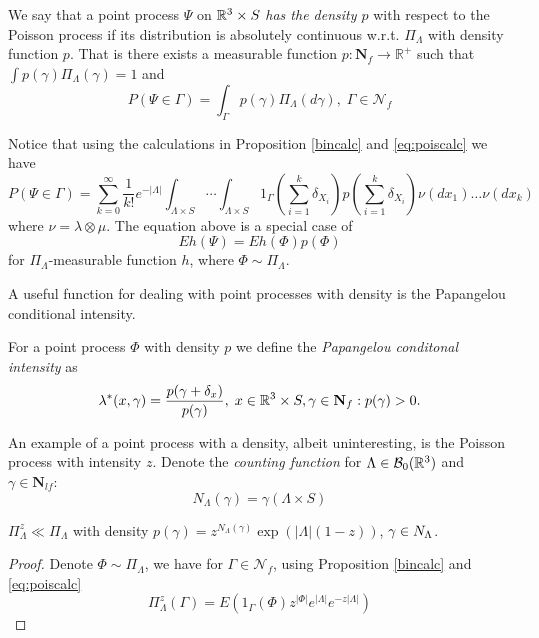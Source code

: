 \begin{definition}
We say that a point process $\Psi$ on ${\mathbb R^3} \times S$ \textit{has the density $p$} with respect to the Poisson process if its distribution is absolutely continuous w.r.t. $\Pi_\Lambda$ with density function $p$. That is there exists a measurable function $p: \mathbf N_f \to \mathbb R^+$ such that $\int p(\gamma) \Pi_\Lambda (\gamma)=1$ and
$$P(\Psi \in \Gamma) = \int_\Gamma p(\gamma) \Pi_\Lambda(d\gamma), \; \Gamma \in \mathcal N_{f}$$
\end{definition}

Notice that using the calculations in Proposition \ref{bincalc} and \ref{eq:poiscalc} we have
$$
P(\Psi \in \Gamma) = \sum^\infty_{k=0} \frac{1}{k!} e^{-|\Lambda|} \int_{\Lambda\times S} \cdots \int_{\Lambda\times S} 1_{\Gamma} \left(\sum^k_{i=1} \delta_{X_i}\right) p\left(\sum^k_{i=1} \delta_{X_i}\right) \nu(dx_1) \dots \nu(dx_k)
$$
where $\nu=\lambda\otimes \mu$.
	The equation above is a special case of 
$$Eh(\Psi)=Eh(\Phi)p(\Phi)$$
for $\Pi_\Lambda$-measurable function $h$, where $\Phi \sim \Pi_\Lambda$.

A useful function for dealing with point processes with density is the Papangelou conditional intensity.
\begin{definition}
	For  a point process $\Phi$ with density $p$ we define the \textit{Papangelou conditonal intensity} as 
	$$\lambda^*(x,\gamma) = \frac{p(\gamma + \delta_x)}{p(\gamma)}, \; x \in {\mathbb R^3} \times S, \gamma \in \mathbf N_{f}: p(\gamma)>0.$$
\end{definition}

An example of a point process with a density, albeit uninteresting, is the Poisson process with intensity $z$.\newline
Denote the \textit{counting function} for $\Lambda \in \mathcal B_0({\mathbb R^3})$ and $\gamma \in \mathbf N_{lf}$:
$$N_\Lambda(\gamma) = \gamma(\Lambda \times S)$$ 

\begin{proposition} $\Pi_\Lambda^z \ll \Pi_\Lambda$ with density $p(\gamma)=z^{N_\Lambda(\gamma)} \exp(|\Lambda|(1-z))$, $\gamma \in \mathbf \mathbf N_{\Lambda}$.
\end{proposition}
\begin{proof}
	Denote $\Phi \sim \Pi_\Lambda$, we have for $\Gamma\in \mathcal N_{f}$, using Proposition \ref{bincalc} and \ref{eq:poiscalc}
	$$\Pi^z_\Lambda(\Gamma) = E(1_\Gamma(\Phi)  z^{|\Phi|} e^{|\Lambda|} e^{-z|\Lambda|}) $$
\end{proof}





